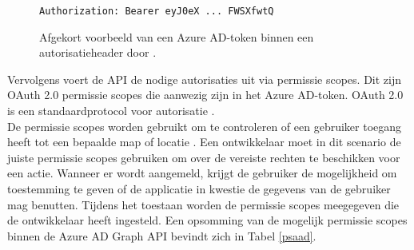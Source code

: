 \begin{figure}[h]
    \scriptsize
    \begin{verbatim}
Authorization: Bearer eyJ0eX ... FWSXfwtQ
    \end{verbatim}    
    \caption[Voorbeeld Azure AD-token]{Afgekort voorbeeld van een Azure \Ac{AD}-token binnen een autorisatieheader door \textcite{Microsoft2015}.}
    \label{ahtoken}
\end{figure}

Vervolgens voert de \ac{API} de nodige autorisaties uit via permissie scopes. Dit zijn OAuth 2.0 permissie scopes die aanwezig zijn in het Azure \Ac{AD}-token. OAuth 2.0 is een standaardprotocol voor autorisatie \autocite{OAuth}. \\

De permissie scopes worden gebruikt om te controleren of een gebruiker toegang heeft tot een bepaalde map of locatie \autocite{Microsoft2016a}. Een ontwikkelaar moet in dit scenario de juiste permissie scopes gebruiken om over de vereiste rechten te beschikken voor een actie. Wanneer er wordt aangemeld, krijgt de gebruiker de mogelijkheid om toestemming te geven of de applicatie in kwestie de gegevens van de gebruiker mag benutten. Tijdens het toestaan worden de permissie scopes meegegeven die de ontwikkelaar heeft ingesteld. Een opsomming van de mogelijk permissie scopes binnen de Azure \ac{AD} Graph \ac{API} bevindt zich in Tabel \ref{psaad}. \\

